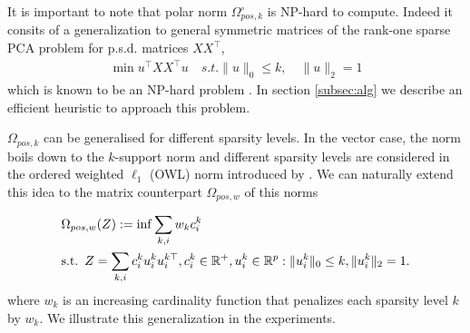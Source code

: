 \documentclass[letterpaper]{article}
\begin{document}
It is important to note that polar norm $\Omega_{pos,k}^{\circ}$ is NP-hard to compute. Indeed it consits of a generalization to general symmetric matrices of the rank-one sparse PCA problem for p.s.d. matrices $XX^{\top}$,
\begin{align*}
\min u^{\top}XX^{\top}u \quad s.t.  \|u\|_0 \leq k,\quad \|u\|_2 = 1
\end{align*}
which is known to be an NP-hard problem \citep{moghaddam2008sparse}. In section \ref{subsec:alg} we describe an efficient heuristic to approach this problem.


%
%

$\Omega_{pos,k}$ can be generalised for different sparsity levels. In the vector case, the norm boils down to the $k$-support norm \citep{argyriou2012sparse} and different sparsity levels are considered in the ordered weighted $\ell_1$ (OWL) norm introduced by \citet{bogdan2013statistical}. We can naturally extend this idea to the matrix counterpart $\Omega_{pos,w}$ of this norms 

\begin{align*}
& \Omega_{pos,w}(Z):=\inf \sum_{k,i}w_{k}c_i^k  \\
& \text{s.t.} \enskip Z=\sum_{k,i} c_i^k u_i^k u_{i}^{k\top},c_i^k\in \mathbb{R}^{+}, u_{i}^k\in\mathbb{R}^p  :   \|u_{i}^k\|_0 \leq k, \|u_{i}^k\|_2 = 1.
\end{align*}
where $w_{k}$ is an increasing cardinality function that penalizes each sparsity level $k$ by $w_{k}$. We illustrate this generalization in the experiments.
\end{document}
